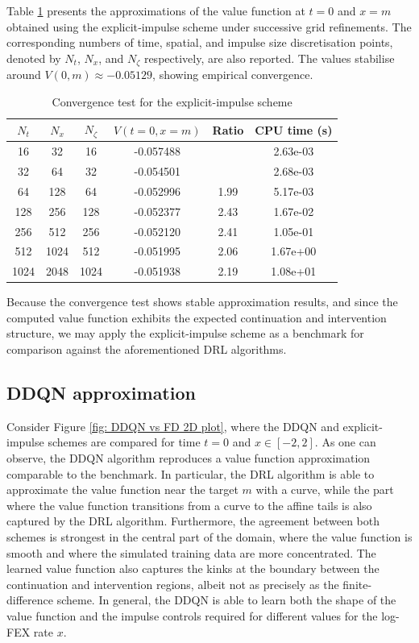 Table \ref{tab: impulse control convergence test} presents the approximations of the value function at $t=0$ and $x=m$ obtained using the explicit‑impulse scheme under successive grid refinements. The corresponding numbers of time, spatial, and impulse size discretisation points, denoted by $N_t$, $N_x$, and $N_\zeta$ respectively, are also reported. The values stabilise around $V(0,m) \approx -0.05129$, showing empirical convergence.
\begin{table}[h]
    \centering
    \begin{tabular}{cccccc}
        \toprule
        $N_t$ & $N_x$ & $N_\zeta$ & $V(t=0, x=m)$ & Ratio & CPU time (s) \\
        \hline
        16 & 32 & 16 & -0.057488 & & 2.63e-03 \\
        32 & 64 & 32 & -0.054501 & & 2.68e-03 \\
        64 & 128 & 64 & -0.052996 & 1.99 & 5.17e-03 \\
        128 & 256 & 128 & -0.052377 & 2.43 & 1.67e-02 \\
        256 & 512 & 256 & -0.052120 & 2.41 & 1.05e-01 \\
        512 & 1024 & 512 & -0.051995 & 2.06 & 1.67e+00 \\
        1024 & 2048 & 1024 & -0.051938 & 2.19 & 1.08e+01 \\
        \bottomrule
    \end{tabular}
    \caption{Convergence test for the explicit-impulse scheme}
    \label{tab: impulse control convergence test}
\end{table}

Because the convergence test shows stable approximation results, and since the computed value
function exhibits the expected continuation and intervention structure, we may apply the explicit-impulse scheme as a benchmark for comparison against the aforementioned DRL algorithms.

\subsection{DDQN approximation}
Consider Figure \ref{fig: DDQN vs FD 2D plot}, where the DDQN and explicit-impulse schemes are compared for time $t=0$ and $x \in [-2,2]$. As one can observe, the DDQN algorithm reproduces a value function approximation comparable to the benchmark. In particular, the DRL algorithm is able to approximate the value function near the target $m$ with a curve, while the part where the value function transitions from a curve to the affine tails is also captured by the DRL algorithm. Furthermore, the agreement between both schemes is strongest in the central part of the domain, where the value function is smooth and where the simulated training data are more concentrated. The learned value function also captures the kinks at the boundary between the continuation and intervention regions, albeit not as precisely as the finite-difference scheme. In general, the DDQN is able to learn both the shape of the value function and the impulse controls required for different values for the log-FEX rate $x$. 

